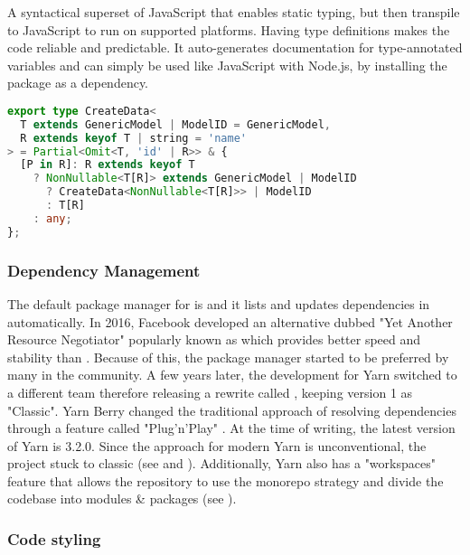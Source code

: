 \documentclass[../main.tex]{subfiles}
\begin{document}
A syntactical superset of JavaScript that enables static typing, but then transpile to JavaScript to run on supported platforms. Having type definitions makes the code reliable and predictable. It auto-generates documentation for type-annotated variables and can simply be used like JavaScript with Node.js, by installing the package as a dependency.

\begin{lstlisting}[language=typescript, caption={recursive \& conditional type definition in \citecode{SrcAppTypes}}]
export type CreateData<
  T extends GenericModel | ModelID = GenericModel,
  R extends keyof T | string = 'name'
> = Partial<Omit<T, 'id' | R>> & {
  [P in R]: R extends keyof T
    ? NonNullable<T[R]> extends GenericModel | ModelID
      ? CreateData<NonNullable<T[R]>> | ModelID
      : T[R]
    : any;
};
\end{lstlisting}

\subsubsection[Yarn]{Dependency Management}

The default package manager for  is  and it lists and updates dependencies in  automatically. In 2016, Facebook developed an alternative dubbed "Yet Another Resource Negotiator" popularly known as  which provides better speed and stability than . Because of this, the package manager started to be preferred by many in the community. A few years later, the development for Yarn switched to a different team therefore releasing a rewrite called , keeping version 1 as "Classic". Yarn Berry changed the traditional approach of resolving dependencies through a feature called "Plug'n'Play" \cite{IntroducingYarn,queirozGettingRidNode2019}. At the time of writing, the latest version of Yarn is 3.2.0. Since the approach for modern Yarn is unconventional, the project stuck to classic (see  and ). Additionally, Yarn also has a "workspaces" feature that allows the repository to use the monorepo strategy \cite{kocikYarnWorkspacesMonorepo2020,hammantTrunkBasedDevelopment,brousseIssueMonorepoPolyrepo2019,potvinWhyGoogleStores2016} and divide the codebase into modules \& packages (see ).

\subsubsection{Code styling}
\end{document}
